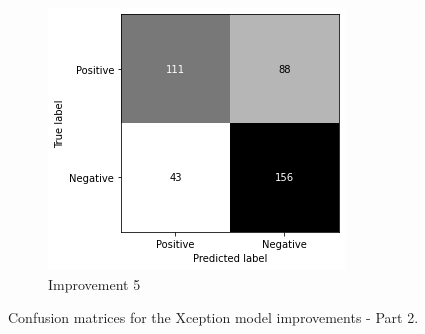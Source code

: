 \begin{figure}
    \begin{subfigure}[b]{0.49\textwidth}
        \centering
        \includegraphics[width=\textwidth]{figures/cm-improv-5.png}
        \caption{Improvement 5}
        \label{fig:cm-improv-5}
    \end{subfigure}
    \caption{Confusion matrices for the Xception model improvements - Part 2.}
    \label{fig:cm-improv-p2}
\end{figure}